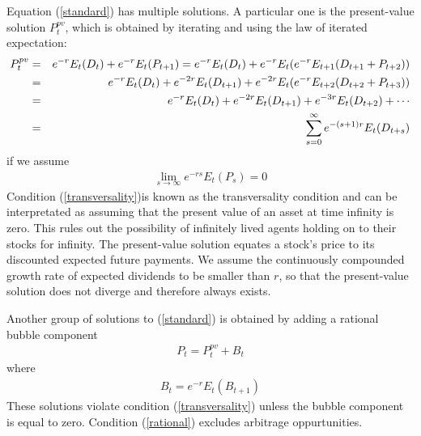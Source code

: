 \documentclass{article}
\begin{document}
Equation (\ref{standard}) has multiple solutions. A particular one is the present-value solution $P_t^{pv}$, which is obtained by iterating and using the law of iterated expectation:
\begin{eqnarray}
P_t^{pv} &=& e^{-r} E_t(D_t) +  e^{-r} E_t(P_{t+1}) = e^{-r} E_t(D_t) +  e^{-r}E_t(e^{-r} E_{t+1}(D_{t+1} + P_{t+2}))  \notag \\
&=& e^{-r} E_t(D_t) + e^{-2r} E_{t}(D_{t+1}) + e^{-2r}E_t(e^{-r} E_{t+2}(D_{t+2} + P_{t+3})) \notag \\
&=& e^{-r} E_t(D_t) + e^{-2r} E_{t}(D_{t+1}) + e^{-3r}E_t(D_{t+2}) + \cdots \notag \\
&=& \sum_{s=0}^{\infty}e^{-(s+1)r}E_t(D_{t+s}) \label{present-value}
\end{eqnarray}
if we assume
\begin{eqnarray}
\lim_{s\rightarrow \infty} e^{-rs}E_t(P_s) = 0 \label{transversality}
\end{eqnarray}
Condition (\ref{transversality})is known as the transversality condition and can be interpretated as assuming that the present value of an asset at time infinity is zero. This rules out the possibility of infinitely lived agents holding on to their stocks for infinity. The present-value solution equates a stock's price to its discounted expected future payments. We assume the continuously compounded growth rate of expected dividends to be smaller than $r$, so that the present-value solution does not diverge and therefore always exists.

Another group of solutions to (\ref{standard}) is obtained by adding a rational bubble component
\begin{eqnarray}
P_t = P_t^{pv} + B_t \label{sum}
\end{eqnarray}
where 
\begin{eqnarray}
B_t = e^{-r}E_t(B_{t+1}) \label{rational}
\end{eqnarray}
These solutions violate condition (\ref{transversality})
unless the bubble component is equal to zero. Condition (\ref{rational}) excludes arbitrage oppurtunities.
\end{document}
